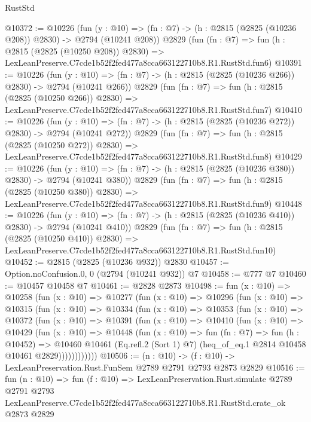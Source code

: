 \begin{lexlean}{RustStd}
\begin{coremodule}
@10372 := @10226
    (fun (y : @10) => (fn : @7) -> (h : @2815 (@2825 (@10236 @208)) @2830) -> @2794 (@10241 @208))
    @2829
    (fun (fn : @7) =>
    fun (h : @2815 (@2825 (@10250 @208)) @2830) =>
    LexLeanPreserve.C7cde1b52f2fed477a8cca663122710b8.R1.RustStd.fun6)
@10391 := @10226
    (fun (y : @10) => (fn : @7) -> (h : @2815 (@2825 (@10236 @266)) @2830) -> @2794 (@10241 @266))
    @2829
    (fun (fn : @7) =>
    fun (h : @2815 (@2825 (@10250 @266)) @2830) =>
    LexLeanPreserve.C7cde1b52f2fed477a8cca663122710b8.R1.RustStd.fun7)
@10410 := @10226
    (fun (y : @10) => (fn : @7) -> (h : @2815 (@2825 (@10236 @272)) @2830) -> @2794 (@10241 @272))
    @2829
    (fun (fn : @7) =>
    fun (h : @2815 (@2825 (@10250 @272)) @2830) =>
    LexLeanPreserve.C7cde1b52f2fed477a8cca663122710b8.R1.RustStd.fun8)
@10429 := @10226
    (fun (y : @10) => (fn : @7) -> (h : @2815 (@2825 (@10236 @380)) @2830) -> @2794 (@10241 @380))
    @2829
    (fun (fn : @7) =>
    fun (h : @2815 (@2825 (@10250 @380)) @2830) =>
    LexLeanPreserve.C7cde1b52f2fed477a8cca663122710b8.R1.RustStd.fun9)
@10448 := @10226
    (fun (y : @10) => (fn : @7) -> (h : @2815 (@2825 (@10236 @410)) @2830) -> @2794 (@10241 @410))
    @2829
    (fun (fn : @7) =>
    fun (h : @2815 (@2825 (@10250 @410)) @2830) =>
    LexLeanPreserve.C7cde1b52f2fed477a8cca663122710b8.R1.RustStd.fun10)
@10452 := @2815 (@2825 (@10236 @932)) @2830
@10457 := Option.noConfusion.{0, 0} (@2794 (@10241 @932)) @7
@10458 := @777 @7
@10460 := @10457 @10458 @7
@10461 := @2828 @2873
@10498 := fun (x : @10) =>
  @10258
    (fun (x : @10) =>
    @10277
      (fun (x : @10) =>
      @10296
        (fun (x : @10) =>
        @10315
          (fun (x : @10) =>
          @10334
            (fun (x : @10) =>
            @10353
              (fun (x : @10) =>
              @10372
                (fun (x : @10) =>
                @10391
                  (fun (x : @10) =>
                  @10410
                    (fun (x : @10) =>
                    @10429
                      (fun (x : @10) =>
                      @10448
                        (fun (x : @10) =>
                        fun (fn : @7) =>
                        fun (h : @10452) =>
                        @10460
                          @10461
                          (Eq.refl.{2} (Sort 1) @7)
                          (heq_of_eq.{1} @2814 @10458 @10461 @2829))))))))))))
@10506 := (n : @10) -> (f : @10) -> LexLeanPreservation.Rust.FunSem @2789 @2791 @2793 @2873 @2829
@10516 := fun (n : @10) =>
  fun (f : @10) =>
  LexLeanPreservation.Rust.simulate
    @2789
    @2791
    @2793
    LexLeanPreserve.C7cde1b52f2fed477a8cca663122710b8.R1.RustStd.crate_ok
    @2873
    @2829
\end{coremodule}
\end{lexlean}

